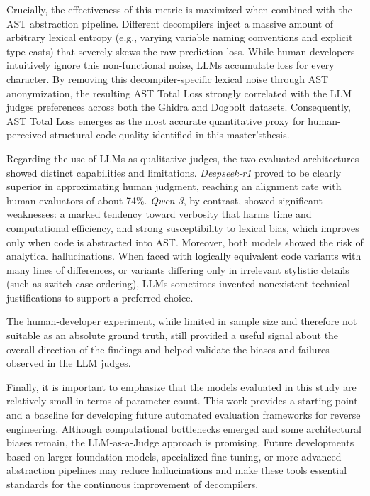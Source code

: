 Crucially, the effectiveness of this metric is maximized when combined with the \ac{AST} abstraction pipeline. Different decompilers inject a massive amount of arbitrary lexical entropy (e.g., varying variable naming conventions and explicit type casts) that severely skews the raw prediction loss. While human developers intuitively ignore this non-functional noise, \acp{LLM} accumulate loss for every character. By removing this decompiler-specific lexical noise through \ac{AST} anonymization, the resulting \ac{AST} Total Loss strongly correlated with the \ac{LLM} judges preferences across both the Ghidra and Dogbolt datasets. Consequently, \ac{AST} Total Loss emerges as the most accurate quantitative proxy for human-perceived structural code quality identified in this master'sthesis.

Regarding the use of \acp{LLM} as qualitative judges, the two evaluated architectures showed distinct capabilities and limitations. \emph{Deepseek-r1} proved to be clearly superior in approximating human judgment, reaching an alignment rate with human evaluators of about 74\%. \emph{Qwen-3}, by contrast, showed significant weaknesses: a marked tendency toward verbosity that harms time and computational efficiency, and strong susceptibility to lexical bias, which improves only when code is abstracted into \ac{AST}. Moreover, both models showed the risk of analytical hallucinations. When faced with logically equivalent code variants with many lines of differences, or variants differing only in irrelevant stylistic details (such as switch-case ordering), \acp{LLM} sometimes invented nonexistent technical justifications to support a preferred choice.

The human-developer experiment, while limited in sample size and therefore not suitable as an absolute ground truth, still provided a useful signal about the overall direction of the findings and helped validate the biases and failures observed in the \ac{LLM} judges.

Finally, it is important to emphasize that the models evaluated in this study are relatively small in terms of parameter count. This work provides a starting point and a baseline for developing future automated evaluation frameworks for reverse engineering. Although computational bottlenecks emerged and some architectural biases remain, the LLM-as-a-Judge approach is promising. Future developments based on larger foundation models, specialized fine-tuning, or more advanced abstraction pipelines may reduce hallucinations and make these tools essential standards for the continuous improvement of decompilers.